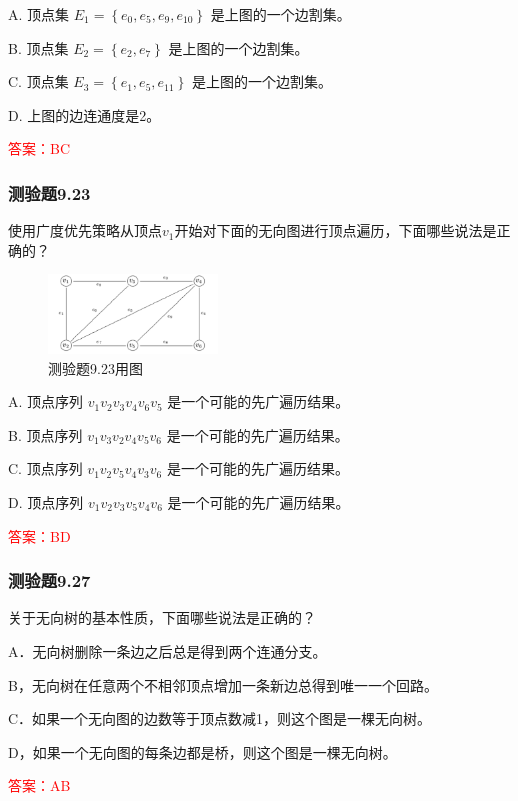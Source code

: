 \documentclass[UTF8, heading=true]{ctexart}
\begin{document}
A. 顶点集 $E_1=\left\{e_0, e_5, e_9, e_{10}\right\}$ 是上图的一个边割集。

B. 顶点集 $E_2=\left\{e_2, e_7\right\}$ 是上图的一个边割集。

C. 顶点集 $E_3=\left\{e_1, e_5, e_{11}\right\}$ 是上图的一个边割集。

D. 上图的边连通度是2。

\textcolor{red}{答案：BC}

\subsubsection{测验题9.23}

使用广度优先策略从顶点$v_1$开始对下面的无向图进行顶点遍历，下面哪些说法是正确的？

\begin{figure}[htbp]
  \centering
  \includegraphics[width=0.4\textwidth]{9.23.png} %
  \caption{测验题9.23用图}
\end{figure}


A. 顶点序列 $v_1 v_2 v_3 v_4 v_6 v_5$ 是一个可能的先广遍历结果。

B. 顶点序列 $v_1 v_3 v_2 v_4 v_5 v_6$ 是一个可能的先广遍历结果。

C. 顶点序列 $v_1 v_2 v_5 v_4 v_3 v_6$ 是一个可能的先广遍历结果。

D. 顶点序列 $v_1 v_2 v_3 v_5 v_4 v_6$ 是一个可能的先广遍历结果。

\textcolor{red}{答案：BD}

\subsubsection{测验题9.27}

关于无向树的基本性质，下面哪些说法是正确的？

A．无向树删除一条边之后总是得到两个连通分支。

B，无向树在任意两个不相邻顶点增加一条新边总得到唯一一个回路。

C．如果一个无向图的边数等于顶点数减1，则这个图是一棵无向树。

D，如果一个无向图的每条边都是桥，则这个图是一棵无向树。

\textcolor{red}{答案：AB}
\end{document}
